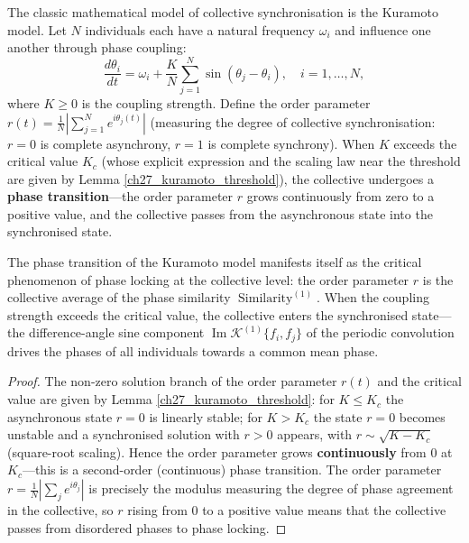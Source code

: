 \begin{proposition}\label{prop:kuramoto_model}
The classic mathematical model of collective synchronisation is the Kuramoto model. Let $N$ individuals each have a natural frequency $\omega_i$ and influence one another through phase coupling:
\[
\frac{d\theta_i}{dt} = \omega_i + \frac{K}{N} \sum_{j=1}^{N} \sin(\theta_j - \theta_i), \quad i = 1, \dots, N,
\]
where $K \ge 0$ is the coupling strength. Define the order parameter $r(t) = \frac{1}{N}|\sum_{j=1}^{N} e^{i\theta_j(t)}|$ (measuring the degree of collective synchronisation: $r=0$ is complete asynchrony, $r=1$ is complete synchrony). When $K$ exceeds the critical value $K_c$ (whose explicit expression and the scaling law near the threshold are given by Lemma \ref{ch27_kuramoto_threshold}), the collective undergoes a \textbf{phase transition}---the order parameter $r$ grows continuously from zero to a positive value, and the collective passes from the asynchronous state into the synchronised state.

The phase transition of the Kuramoto model manifests itself as the critical phenomenon of phase locking at the collective level: the order parameter $r$ is the collective average of the phase similarity $\operatorname{Similarity}^{(1)}$. When the coupling strength exceeds the critical value, the collective enters the synchronised state---the difference-angle sine component $\operatorname{Im}\mathcal{K}^{(1)}\{f_i, f_j\}$ of the periodic convolution drives the phases of all individuals towards a common mean phase.
\end{proposition}

\begin{proof}
The non-zero solution branch of the order parameter $r(t)$ and the critical value are given by Lemma \ref{ch27_kuramoto_threshold}: for $K \le K_c$ the asynchronous state $r=0$ is linearly stable; for $K > K_c$ the state $r=0$ becomes unstable and a synchronised solution with $r>0$ appears, with $r \sim \sqrt{K-K_c}$ (square-root scaling). Hence the order parameter grows \textbf{continuously} from $0$ at $K_c$---this is a second-order (continuous) phase transition. The order parameter $r = \frac{1}{N}|\sum_j e^{i\theta_j}|$ is precisely the modulus measuring the degree of phase agreement in the collective, so $r$ rising from $0$ to a positive value means that the collective passes from disordered phases to phase locking.
\end{proof}

